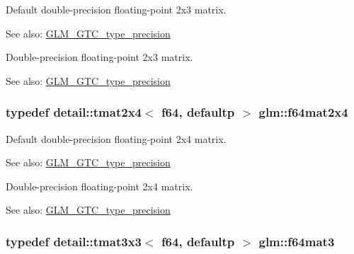 Default double-precision floating-point 2x3 matrix. \begin{Desc}
\item[See also:]\hyperlink{group__gtc__type__precision}{GLM\_\-GTC\_\-type\_\-precision}\end{Desc}
Double-precision floating-point 2x3 matrix. \begin{Desc}
\item[See also:]\hyperlink{group__gtc__type__precision}{GLM\_\-GTC\_\-type\_\-precision} \end{Desc}
\hypertarget{group__gtc__type__precision_g7f84d2c51081d56599a45c01d67ac155}{
\subsubsection[f64mat2x4]{\setlength{\rightskip}{0pt plus 5cm}typedef detail::tmat2x4$<$ f64, defaultp $>$ {\bf glm::f64mat2x4}}}
\label{group__gtc__type__precision_g7f84d2c51081d56599a45c01d67ac155}


Default double-precision floating-point 2x4 matrix. \begin{Desc}
\item[See also:]\hyperlink{group__gtc__type__precision}{GLM\_\-GTC\_\-type\_\-precision}\end{Desc}
Double-precision floating-point 2x4 matrix. \begin{Desc}
\item[See also:]\hyperlink{group__gtc__type__precision}{GLM\_\-GTC\_\-type\_\-precision} \end{Desc}
\hypertarget{group__gtc__type__precision_ga9e69ab90c0130b9a84a0a7fd8e49664}{
\subsubsection[f64mat3]{\setlength{\rightskip}{0pt plus 5cm}typedef detail::tmat3x3$<$ f64, defaultp $>$ {\bf glm::f64mat3}}}
\label{group__gtc__type__precision_ga9e69ab90c0130b9a84a0a7fd8e49664}


